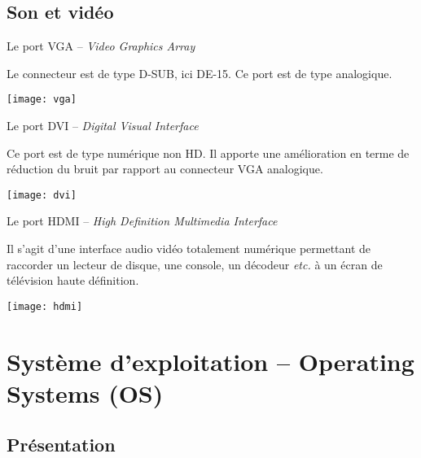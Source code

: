 \subsection{Son et vidéo}




\begin{minipage}[c]{.85\linewidth}
Le port VGA -- \textit{Video Graphics Array}

Le connecteur est de type D-SUB, ici DE-15. Ce port est de type analogique.

\end{minipage} \hfill
\begin{minipage}[c]{.14\linewidth}
\begin{center}
\texttt{[image: vga]}
\end{center}
\end{minipage}


\begin{minipage}[c]{.85\linewidth}
Le port DVI -- \textit{Digital Visual Interface}

Ce port est de type numérique non HD. Il apporte une amélioration en terme de réduction du bruit par rapport au connecteur VGA analogique.
\end{minipage} \hfill
\begin{minipage}[c]{.14\linewidth}
\begin{center}
\texttt{[image: dvi]}
\end{center}
\end{minipage}


\begin{minipage}[c]{.85\linewidth}
Le port HDMI -- \textit{High Definition Multimedia Interface}

Il s'agit d'une interface audio vidéo totalement numérique permettant de raccorder un lecteur de disque, une console, un décodeur \textit{etc.} à un écran de télévision haute définition.
\end{minipage} \hfill
\begin{minipage}[c]{.14\linewidth}
\begin{center}
\texttt{[image: hdmi]}
\end{center}
\end{minipage}


\section{Système d'exploitation -- Operating Systems (OS)}
\subsection{Présentation}

